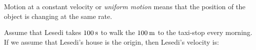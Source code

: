         
        \label{m38795*id69835}Motion at a constant velocity or \textsl{uniform motion} means that the position of the object is changing at the same rate.\par 
        \label{m38795*id69845}Assume that Lesedi takes \begin{math}100\phantom{\rule{2pt}{0ex}}\mathrm{s}\end{math} to walk the \begin{math}100\phantom{\rule{2pt}{0ex}}\mathrm{m}\end{math} to the taxi-stop every morning. If we assume that Lesedi's house is the origin, then Lesedi's velocity is:\par 
        \label{m38795*id69850}\nopagebreak\noindent{}
